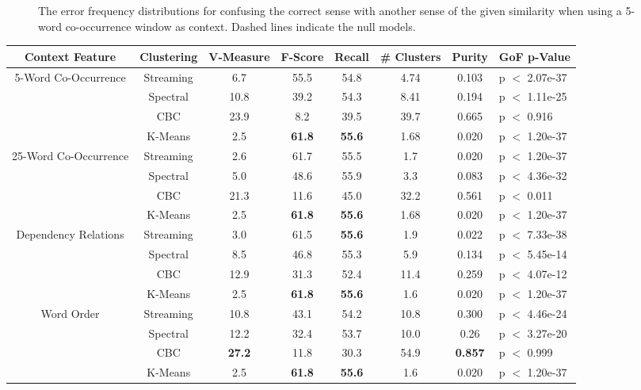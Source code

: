 \documentclass[11pt]{article}
\begin{document}
\begin{figure}[t!f]
  \caption{The error frequency distributions for confusing the correct sense
    with another sense of the given similarity when using a 5-word co-occurrence
    window as context.  Dashed lines indicate the null models. }
  \label{fig:sense-confusion}
\end{figure}


\begin{table}[!ftb]
  \center
  \footnotesize
  \begin{tabular}{ c  c  c  c  c  c c l }
  \toprule
  \textbf{Context Feature} & \textbf{Clustering} &
  \textbf{V-Measure} & \textbf{F-Score} &
  \textbf{Recall} & \textbf{\# Clusters}  &
  \textbf{Purity} & \textbf{GoF p-Value} \\
  \midrule
    \multirow{4}{*}{5-Word Co-Occurrence}
& Streaming & 6.7 & 55.5 & 54.8 & 4.74 & 0.103& p $<$ 2.07e-37 \\
& Spectral & 10.8 & 39.2 & 54.3 & 8.41 & 0.194& p $<$ 1.11e-25 \\
& CBC & 23.9 & 8.2 & 39.5 & 39.7 & 0.665& p $<$ 0.916\\
& K-Means & 2.5 & \textbf{61.8} & \textbf{55.6} & 1.68 & 0.020 & p $<$ 1.20e-37 \\

  \midrule

    \multirow{4}{*}{25-Word Co-Occurrence}
& Streaming & 2.6 & 61.7 & 55.5 & 1.7 & 0.020 & p $<$ 1.20e-37 \\
& Spectral & 5.0 & 48.6 & 55.9 & 3.3 & 0.083 & p $<$ 4.36e-32 \\
& CBC & 21.3 & 11.6 & 45.0 & 32.2 & 0.561 & p $<$ 0.011 \\
& K-Means & 2.5 & \textbf{61.8} & \textbf{55.6} & 1.68 & 0.020 & p $<$ 1.20e-37 \\
  \midrule

    \multirow{4}{*}{Dependency Relations}
& Streaming & 3.0 & 61.5 & \textbf{55.6} & 1.9 & 0.022 & p $<$ 7.33e-38 \\
& Spectral & 8.5 & 46.8 & 55.3 & 5.9 & 0.134 & p $<$ 5.45e-14 \\
& CBC & 12.9 & 31.3 & 52.4 & 11.4 & 0.259 & p $<$ 4.07e-12 \\
& K-Means & 2.5 & \textbf{61.8} & \textbf{55.6} & 1.6 & 0.020 & p $<$ 1.20e-37 \\
  \midrule

    \multirow{4}{*}{Word Order}
& Streaming & 10.8 & 43.1 & 54.2 & 10.8 & 0.300 & p $<$ 4.46e-24 \\
& Spectral & 12.2 & 32.4 & 53.7 & 10.0 & 0.26 & p $<$ 3.27e-20 \\
& CBC & \textbf{27.2} & 11.8 & 30.3 & 54.9 & \textbf{0.857} & p $<$ 0.999\\
& K-Means & 2.5 & \textbf{61.8} & \textbf{55.6} & 1.6 & 0.020 & p $<$ 1.20e-37 \\
  \midrule


\end{tabular}
\end{table}
\end{document}
